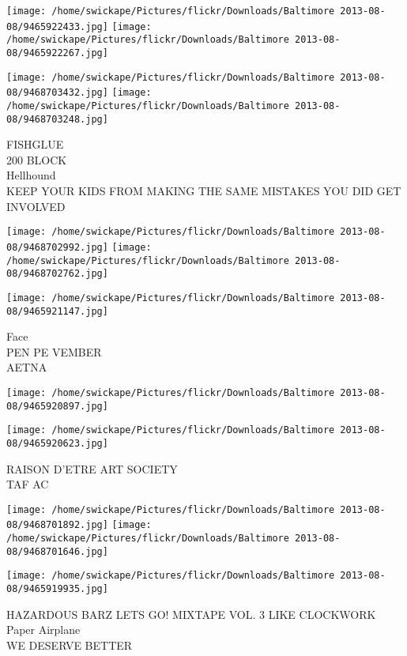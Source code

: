 \documentclass[10pt,letterpaper]{article}
\begin{document}
\texttt{[image: /home/swickape/Pictures/flickr/Downloads/Baltimore 2013-08-08/9465922433.jpg]}
\texttt{[image: /home/swickape/Pictures/flickr/Downloads/Baltimore 2013-08-08/9465922267.jpg]}

\texttt{[image: /home/swickape/Pictures/flickr/Downloads/Baltimore 2013-08-08/9468703432.jpg]}
\texttt{[image: /home/swickape/Pictures/flickr/Downloads/Baltimore 2013-08-08/9468703248.jpg]}

FISHGLUE\\
200 BLOCK\\
Hellhound\\
KEEP YOUR KIDS FROM MAKING THE SAME MISTAKES YOU DID GET INVOLVED\\
\pagebreak

\texttt{[image: /home/swickape/Pictures/flickr/Downloads/Baltimore 2013-08-08/9468702992.jpg]}
\texttt{[image: /home/swickape/Pictures/flickr/Downloads/Baltimore 2013-08-08/9468702762.jpg]}

\texttt{[image: /home/swickape/Pictures/flickr/Downloads/Baltimore 2013-08-08/9465921147.jpg]}

Face\\
PEN PE VEMBER\\
AETNA\\
\pagebreak

\texttt{[image: /home/swickape/Pictures/flickr/Downloads/Baltimore 2013-08-08/9465920897.jpg]}

\vspace{0.25in}
\texttt{[image: /home/swickape/Pictures/flickr/Downloads/Baltimore 2013-08-08/9465920623.jpg]}

RAISON D'ETRE ART SOCIETY\\
TAF AC\\
\pagebreak

\texttt{[image: /home/swickape/Pictures/flickr/Downloads/Baltimore 2013-08-08/9468701892.jpg]}
\texttt{[image: /home/swickape/Pictures/flickr/Downloads/Baltimore 2013-08-08/9468701646.jpg]}

\texttt{[image: /home/swickape/Pictures/flickr/Downloads/Baltimore 2013-08-08/9465919935.jpg]}

HAZARDOUS BARZ LETS GO! MIXTAPE VOL. 3 LIKE CLOCKWORK\\
Paper Airplane\\
WE DESERVE BETTER\\
\pagebreak
\end{document}
